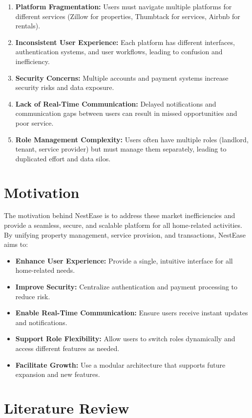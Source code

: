 \documentclass[conference]{IEEEtran}
\begin{document}
\begin{enumerate}
    \item \textbf{Platform Fragmentation:} Users must navigate multiple platforms for different services (Zillow for properties, Thumbtack for services, Airbnb for rentals).
    \item \textbf{Inconsistent User Experience:} Each platform has different interfaces, authentication systems, and user workflows, leading to confusion and inefficiency.
    \item \textbf{Security Concerns:} Multiple accounts and payment systems increase security risks and data exposure.
    \item \textbf{Lack of Real-Time Communication:} Delayed notifications and communication gaps between users can result in missed opportunities and poor service.
    \item \textbf{Role Management Complexity:} Users often have multiple roles (landlord, tenant, service provider) but must manage them separately, leading to duplicated effort and data silos.
\end{enumerate}

\section{Motivation}
The motivation behind NestEase is to address these market inefficiencies and provide a seamless, secure, and scalable platform for all home-related activities. By unifying property management, service provision, and transactions, NestEase aims to:

\begin{itemize}
    \item \textbf{Enhance User Experience:} Provide a single, intuitive interface for all home-related needs.
    \item \textbf{Improve Security:} Centralize authentication and payment processing to reduce risk.
    \item \textbf{Enable Real-Time Communication:} Ensure users receive instant updates and notifications.
    \item \textbf{Support Role Flexibility:} Allow users to switch roles dynamically and access different features as needed.
    \item \textbf{Facilitate Growth:} Use a modular architecture that supports future expansion and new features.
\end{itemize}

\section{Literature Review}
\end{document}
